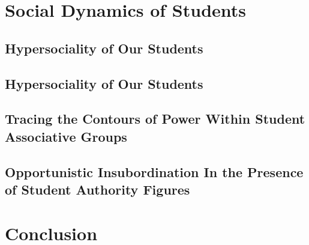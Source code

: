 \documentclass[12pt]{article}
\begin{document}
	\section{Social Dynamics of Students}
	\subsection{Hypersociality of Our Students}
	\subsection{Hypersociality of Our Students}
	\subsection{Tracing the Contours of Power Within Student Associative Groups}
	\subsection{Opportunistic Insubordination In the Presence of Student Authority Figures}
	
	\section{Conclusion}
	
	\pagebreak
	
\end{document}
